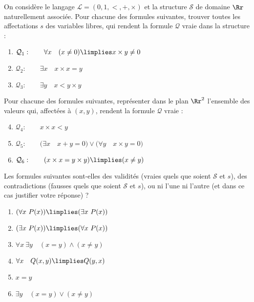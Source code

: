 \documentclass[11pt,class=report,crop=false]{standalone}
\begin{document}
\begin{exercicecours}
On considère le langage $\mathcal{L} = (0,1,<,+,\times)$ et la structure $\mathcal{S}$ de domaine $\Rr$ naturellement associée.	
Pour chacune des formules suivantes, trouver toutes les affectations $s$ des variables libres, qui rendent la formule $\mathcal{Q}$ vraie dans la structure :
\begin{enumerate}
	\item $\mathcal{Q}_1 : \qquad \forall x \quad (x \neq 0) \limplies x \times y \neq 0$
	
	\item $\mathcal{Q}_2 : \qquad \exists x \quad x \times x = y$
	
	\item $\mathcal{Q}_3 : \qquad \exists y \quad x < y \times y $
\end{enumerate}

Pour chacune des formules suivantes, représenter dans le plan $\Rr^2$ l'ensemble des valeurs qui, affectées à $(x,y)$, rendent la formule $\mathcal{Q}$ vraie :
\begin{enumerate}
	\setcounter{enumi}{3}
	\item $\mathcal{Q}_4 : \qquad  x \times x  < y$
	
	\item $\mathcal{Q}_5 : \qquad \big( \exists x \quad x+y = 0\big) \lor  \big( \forall y \quad x \times y = 0\big)$
	
	\item $\mathcal{Q}_6 : \qquad (x \times x = y \times y) \limplies (x \neq y)$
\end{enumerate}
\end{exercicecours}


\begin{exercicecours}
Les formules suivantes sont-elles des validités (vraies quels que soient $\mathcal{S}$ et $s$), des contradictions (fausses quels que soient $\mathcal{S}$ et $s$), ou ni l'une ni l'autre (et dans ce cas justifier votre réponse) ?
\begin{enumerate}
	\item $(\forall x \ P(x)) \limplies (\exists x \ P(x))$

	\item $(\exists x \ P(x)) \limplies (\forall x \ P(x)) $
	
	\item $\forall x \ \exists y \quad (x=y) \land (x \neq y)$
	
	\item $ \forall x \quad Q(x,y) \limplies Q(y,x)$
				
	\item $x =y $
	
	\item $\exists y \quad (x=y) \lor (x \neq y)$
\end{enumerate}
\end{exercicecours}
\end{document}
